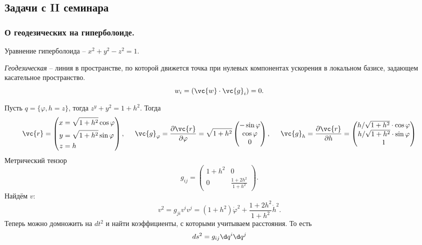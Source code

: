 \subsection{Задачи с II семинара}

\subsubsection*{О геодезических на гиперболоиде.}

Уравнение гиперболоида -- $x^2 + y^2 - z^2 = 1$.
\begin{to_def} 
    \textit{Геодезическая} -- линия в пространстве, по которой движется точка при нулевых компонентах ускорения в локальном базисе, задающем касательное пространство. 
    $$
        w_i = (\vc{w} \cdot \vc{g}_i) = 0.
    $$
\end{to_def}

Пусть $q = \{\varphi, h=z\}$, тогда $z^y + y^2 = 1 + h^2$. Тогда
$$
    \vc{r} = 
    \left(\begin{aligned}
        x &= \sqrt{1 + h^2} \cos \varphi\\
        y &= \sqrt{1+h^2} \sin \varphi \\
        z &= h
    \end{aligned}\right), \hspace{0.5cm} 
    \vc{g}_\varphi = \frac{\partial \vc{r}}{\partial \varphi} = \sqrt{1 + h^2}
    \begin{pmatrix}
        -\sin\varphi \\ \cos \varphi \\ 0
    \end{pmatrix}, \hspace{0.5cm} 
    \vc{g}_h = \frac{\partial \vc{r}}{\partial h} = \begin{pmatrix}
        h  / \sqrt{1 + h^2} \cdot  \cos\varphi \\
        h  / \sqrt{1 + h^2}  \cdot \sin\varphi \\
        1
    \end{pmatrix}
$$
Метрический тензор
$$
    g_{ij} = \begin{pmatrix}
        1 + h^2 & 0 \\
        0 & \frac{1+2h^2}{1+h^2} 
    \end{pmatrix}.
$$
Найдём $v$:
$$
    v^2 = g_{ji} v^i v^j = (1+h^2) \dot{\varphi}^2 + \frac{1+2h^2}{1+h^2} \dot{h}^2.
$$
Теперь можно домножить на $dt^2$ и найти коэффициенты, с которыми учитываем расстояния. То есть
\begin{equation}
    ds^2 = g_{ij} \d q^i \d q^j
\end{equation}


